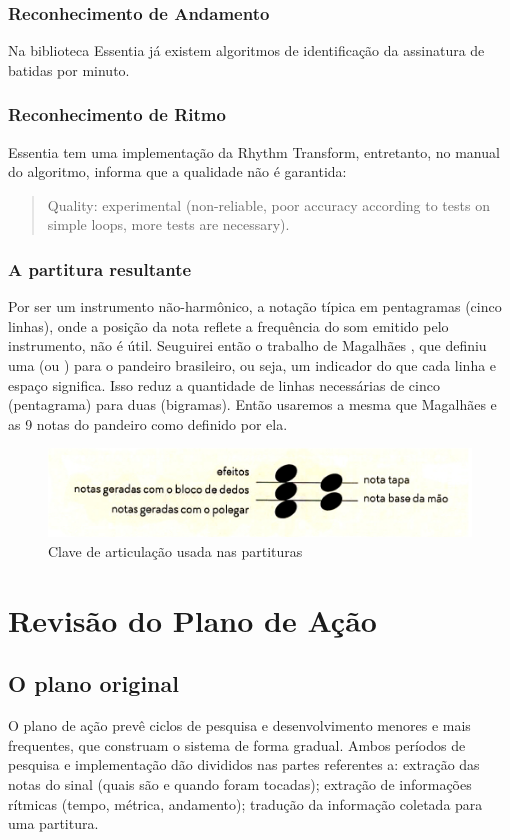 \documentclass[
  dissertacao,
  brazil
]{ThesisPUC}
\begin{document}
\subsection{Reconhecimento de Andamento}
Na biblioteca Essentia já existem algoritmos de identificação da assinatura de batidas por minuto.

\subsection{Reconhecimento de Ritmo}
Essentia tem uma implementação da Rhythm Transform, entretanto, no manual do algoritmo, informa que a qualidade não é garantida:
\begin{quote}
    Quality: experimental (non-reliable, poor accuracy according to tests on simple loops, more tests are necessary).
\end{quote}

\subsection{A partitura resultante}
Por ser um instrumento não-harmônico, a notação típica em pentagramas (cinco linhas), onde a posição da nota reflete a frequência do som emitido pelo instrumento, não é útil. Seuguirei então o trabalho de Magalhães \cite{magalhaes2018tecnica}, que definiu uma \CA (ou \ca) para o pandeiro brasileiro, ou seja, um indicador do que cada linha e espaço significa. Isso reduz a quantidade de linhas necessárias de cinco (pentagrama) para duas (bigramas). Então usaremos a mesma \ca que Magalhães e as 9 notas do pandeiro como definido por ela.
\begin{figure}
    \centering
    \includegraphics[width=\textwidth]{ClaveDeArticulacao.jpg}
    \caption{Clave de articulação usada nas partituras}
    \label{fig:clave}
\end{figure}


\chapter{Revisão do Plano de Ação}
\section{O plano original}
O plano de ação prevê ciclos de pesquisa e desenvolvimento menores e mais frequentes, que construam o sistema de forma gradual.
Ambos períodos de pesquisa e implementação dão divididos nas partes referentes a: extração das notas do sinal (quais são e quando foram tocadas); extração de informações rítmicas (tempo, métrica, andamento); tradução da informação coletada para uma partitura.
\end{document}
